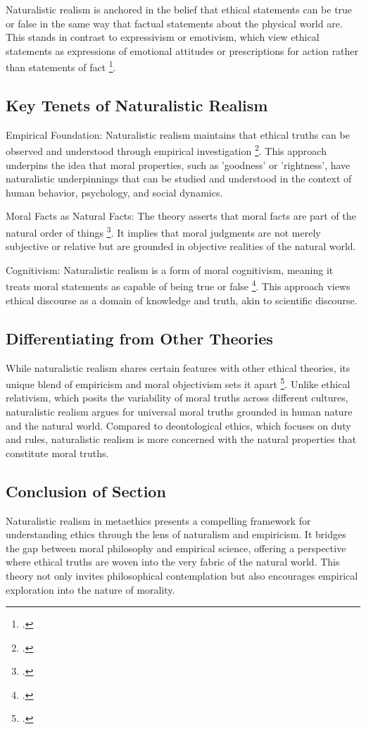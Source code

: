 \documentclass[12pt,a4paper]{article}
\begin{document}
Naturalistic realism is anchored in the belief that ethical statements can be true or false in the same way that factual statements about the physical world are. This stands in contrast to expressivism or emotivism, which view ethical statements as expressions of emotional attitudes or prescriptions for action rather than statements of fact \footcite{FinlayCuneo2008}. 

\subsection{Key Tenets of Naturalistic Realism}
Empirical Foundation: Naturalistic realism maintains that ethical truths can be observed and understood through empirical investigation \footcite{Stringer2018}. This approach underpins the idea that moral properties, such as 'goodness' or 'rightness', have naturalistic underpinnings that can be studied and understood in the context of human behavior, psychology, and social dynamics.

Moral Facts as Natural Facts: The theory asserts that moral facts are part of the natural order of things \footcite{Brink2001}. It implies that moral judgments are not merely subjective or relative but are grounded in objective realities of the natural world.

Cognitivism: Naturalistic realism is a form of moral cognitivism, meaning it treats moral statements as capable of being true or false \footcite{McPherson2012}. This approach views ethical discourse as a domain of knowledge and truth, akin to scientific discourse.

\subsection{Differentiating from Other Theories}
While naturalistic realism shares certain features with other ethical theories, its unique blend of empiricism and moral objectivism sets it apart \footcite{Arruda2018}. Unlike ethical relativism, which posits the variability of moral truths across different cultures, naturalistic realism argues for universal moral truths grounded in human nature and the natural world. Compared to deontological ethics, which focuses on duty and rules, naturalistic realism is more concerned with the natural properties that constitute moral truths.

\subsection{Conclusion of Section}
Naturalistic realism in metaethics presents a compelling framework for understanding ethics through the lens of naturalism and empiricism. It bridges the gap between moral philosophy and empirical science, offering a perspective where ethical truths are woven into the very fabric of the natural world. This theory not only invites philosophical contemplation but also encourages empirical exploration into the nature of morality.
\end{document}
